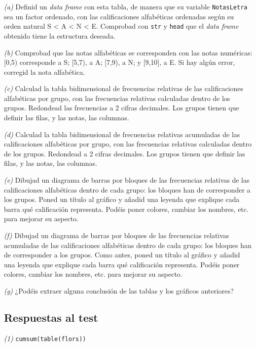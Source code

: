 \documentclass[]{book}
\theoremstyle{definition}
\theoremstyle{definition}
\theoremstyle{definition}
\theoremstyle{remark}
\begin{document}
\emph{(a)} Definid un \emph{data frame} con esta tabla, de manera que su variable \texttt{NotasLetra} sea un factor ordenado, con las calificaciones alfabéticas ordenadas según su orden natural S \textless{} A \textless{} N \textless{} E. Comprobad con \texttt{str} y \texttt{head} que el \emph{data frame} obtenido tiene la estructura deseada.

\emph{(b)} Comprobad que las notas alfabéticas se corresponden con las notas numéricas: {[}0,5) corresponde a S; {[}5,7), a A; {[}7,9), a N; y {[}9,10{]}, a E. Si hay algún error, corregid la nota alfabética.

\emph{(c)} Calculad la tabla bidimensional de frecuencias relativas de las calificaciones alfabéticas por grupo, con las frecuencias relativas calculadas dentro de los grupos. Redondead las frecuencias a 2 cifras decimales. Los grupos tienen que definir las filas, y las notas, las columnas.

\emph{(d)} Calculad la tabla bidimensional de frecuencias relativas acumuladas de las calificaciones alfabéticas por grupo, con las frecuencias relativas calculadas dentro de los grupos. Redondead a 2 cifras decimales. Los grupos tienen que definir las filas, y las notas, las columnas.

\emph{(e)} Dibujad un diagrama de barras por bloques de las frecuencias relativas
de las calificaciones alfabéticas dentro de cada grupo: los bloques han de corresponder a los grupos. Poned un título al gráfico y añadid una leyenda que explique cada barra qué calificación representa. Podéis poner colores, cambiar los nombres, etc. para mejorar su aspecto.

\emph{(f)} Dibujad un diagrama de barras por bloques de las frecuencias relativas acumuladas de las calificaciones alfabéticas dentro de cada grupo: los bloques han de corresponder a los grupos. Como antes, poned un título al gráfico y añadid una leyenda que explique cada barra qué calificación representa. Podéis poner colores, cambiar los nombres, etc. para mejorar su aspecto.

\emph{(g)} ¿Podéis extraer alguna conclusión de las tablas y los gráficos anteriores?

\hypertarget{respuestas-al-test-8}{%
\subsection*{Respuestas al test}\label{respuestas-al-test-8}}

\emph{(1)} \texttt{cumsum(table(flors))}
\end{document}
